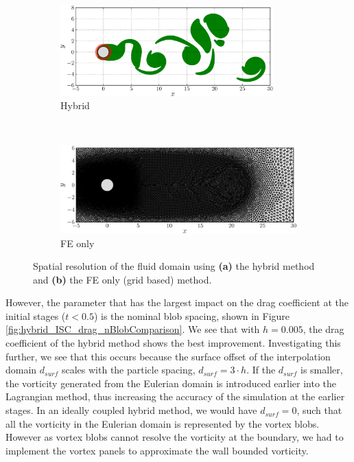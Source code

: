 	\begin{figure}[!p]
     \centering
     \begin{subfigure}[t]{0.49\textwidth}
             \includegraphics[width=0.9\textwidth]{./figures/validation/isc/hybrid_ISC_blobsLoc-crop.png}
             \caption{Hybrid}
             \label{fig:hybrid_ISC_blobsLoc-crop}
     \end{subfigure}%
     ~ %
     \begin{subfigure}[t]{0.49\textwidth}
             \includegraphics[width=\textwidth]{./figures/validation/isc/FE_ISC_mesh-crop-LR.png}
             \caption{FE only}
             \label{fig:FE_ISC_mesh-crop}
     \end{subfigure}
     \caption{Spatial resolution of the fluid domain using \textbf{(a)} the hybrid method and \textbf{(b)} the FE only (grid based) method.}
     \label{fig:hybrid_gridResolution}
	\end{figure}	


However, the parameter that has the largest impact on the drag coefficient at the initial stages ($t<0.5$) is the nominal blob spacing, shown in Figure \ref{fig:hybrid_ISC_drag_nBlobComparison}. We see that with $h=0.005$, the drag coefficient of the hybrid method shows the best improvement. Investigating this further, we see that this occurs because the surface offset of the interpolation domain $d_{surf}$ scales with the particle spacing, $d_{surf}=3\cdot{h}$. If the $d_{surf}$ is smaller, the vorticity generated from the Eulerian domain is introduced earlier into the Lagrangian method, thus increasing the accuracy of the simulation at the earlier stages. In an ideally coupled hybrid method, we would have $d_{surf}=0$, such that all the vorticity in the Eulerian domain is represented by the vortex blobs. However as vortex blobs cannot resolve the vorticity at the boundary, we had to implement the vortex panels to approximate the wall bounded vorticity.

